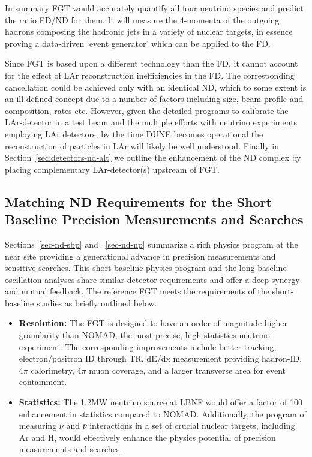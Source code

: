 In summary FGT would accurately quantify all four neutrino species and predict the ratio FD/ND for them. 
It will measure the 4-momenta of the outgoing hadrons composing the hadronic jets in a variety of 
nuclear targets, in essence proving a data-driven `event generator' which can be applied to the FD. 

Since FGT is based upon a different technology than the FD, it cannot account for 
the effect of LAr reconstruction inefficiencies in the FD. The corresponding cancellation could be achieved only 
with an identical ND, which to some extent is an ill-defined concept due to a number of factors including size, 
beam profile and composition, rates etc. However, given the detailed programs to calibrate the LAr-detector 
in a test beam and the multiple efforts with neutrino experiments employing LAr detectors, by the time DUNE 
becomes operational the reconstruction of particles in LAr will likely be well understood. Finally in 
Section~\ref{sec:detectors-nd-alt} we outline the enhancement of the ND complex by placing 
complementary LAr-detector(s) upstream of FGT. 



\subsection{Matching ND Requirements for the Short Baseline Precision Measurements and Searches} 
\label{cdrsec:detectors-nd-ref-fgt-req-sbp}


Sections~\ref{sec-nd-sbp} and ~\ref{sec-nd-np} summarize a rich physics program at the near site 
providing a generational advance in precision measurements and sensitive searches. 
This short-baseline physics program and the long-baseline oscillation analyses  
share similar detector requirements and offer a deep synergy and mutual feedback.  
The reference FGT meets the requirements of the short-baseline studies as briefly outlined below. 

\begin{itemize}
    \item {\bf Resolution:} The FGT is designed to have an order of magnitude higher granularity than NOMAD, 
    the most precise, high statistics neutrino experiment. The corresponding improvements include better tracking, 
    electron/positron ID through TR, dE/dx measurement providing hadron-ID, 4$\pi$ calorimetry,
     4$\pi$ muon coverage, and a larger transverse area for event containment. 
    
    \item {\bf Statistics:} The 1.2MW neutrino source at LBNF would offer a factor of 100 enhancement in statistics 
    compared to NOMAD. Additionally, the program of measuring $\nu$ and $\bar\nu$ interactions 
    in a set of crucial nuclear targets, including Ar and H, would effectively enhance the physics potential 
    of precision measurements and searches.  

                 
\end{itemize}

